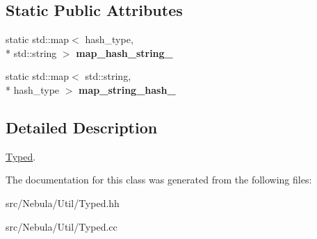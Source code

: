 \subsection*{Static Public Attributes}
\begin{DoxyCompactItemize}
\item 
\hypertarget{classNeb_1_1Util_1_1Typed_ac2b126b7bc6253459783fa73b9a68afe}{static std\-::map$<$ hash\-\_\-type, \\*
std\-::string $>$ {\bfseries map\-\_\-hash\-\_\-string\-\_\-}}\label{classNeb_1_1Util_1_1Typed_ac2b126b7bc6253459783fa73b9a68afe}

\item 
\hypertarget{classNeb_1_1Util_1_1Typed_af1437465dca6b5a70b2e900e6391e62a}{static std\-::map$<$ std\-::string, \\*
hash\-\_\-type $>$ {\bfseries map\-\_\-string\-\_\-hash\-\_\-}}\label{classNeb_1_1Util_1_1Typed_af1437465dca6b5a70b2e900e6391e62a}

\end{DoxyCompactItemize}


\subsection{Detailed Description}
\hyperlink{classNeb_1_1Util_1_1Typed}{Typed}. 

The documentation for this class was generated from the following files\-:\begin{DoxyCompactItemize}
\item 
src/\-Nebula/\-Util/Typed.\-hh\item 
src/\-Nebula/\-Util/Typed.\-cc\end{DoxyCompactItemize}

